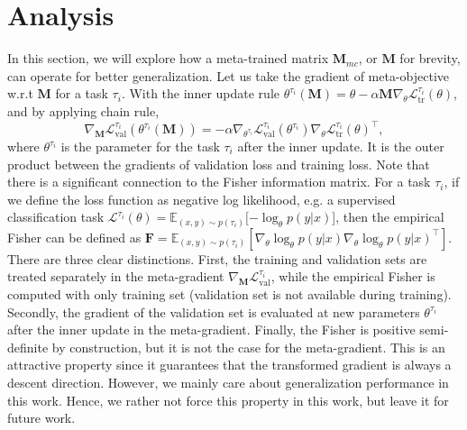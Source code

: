 \documentclass{article}
\newcommand*{\B}[1]{\mathbf{#1}}
\newcommand*{\C}[1]{\mathcal{#1}}
\begin{document}
\section{Analysis}
In this section, we will explore how a meta-trained matrix $\B{M}_{mc}$, or $\B{M}$ for brevity, can operate for better generalization. Let us take the gradient of meta-objective w.r.t $\B{M}$ for a task $\tau_i$. With the inner update rule $\theta^{\tau_i}(\B{M}) = \theta - \alpha  \B{M} \nabla_\theta \C{L}_\textrm{tr}^{\tau_i}(\theta)$, and by applying chain rule,
\begin{equation}
\nabla_{\mathbf{M}} \C{L}_\textrm{val}^{\tau_i}(\theta^{\tau_i}(\B{M})) = -\alpha \nabla_{\theta^{\tau_i}} \C{L}_\textrm{val}^{\tau_i} ( \theta^{\tau_i} ) \nabla_\theta \C{L}_\textrm{tr}^{\tau_i}(\theta)^\top, 
\end{equation}
where $\theta^{\tau_i}$ is the parameter for the task ${\tau_i}$ after the inner update.
It is the outer product between the gradients of validation loss and training loss. Note that there is a significant connection to the Fisher information matrix. For a task ${\tau_i}$, if we define the loss function as negative log likelihood, e.g. a supervised classification task $\mathcal{L}^{\tau_i} (\theta) = \mathbb{E}_{(x,y) \sim p({\tau_i})} [-\log_\theta p(y|x)$], then the empirical Fisher can be defined as $\mathbf{F} = \mathbb{E}_{(x,y) \sim p({\tau_i})} [\nabla_\theta \log_\theta p(y|x) \nabla_\theta \log_\theta p(y|x)^\top]$. There are three clear distinctions. First, the training and validation sets are treated separately in the meta-gradient $\nabla_{\B{M}} \C{L}_\textrm{val}^{\tau_i}$, while the empirical Fisher is computed with only training set (validation set is not available during training). Secondly, the gradient of the validation set is evaluated at new parameters $\theta^{\tau_i}$ after the inner update in the meta-gradient. Finally, the Fisher is positive semi-definite by construction, but it is not the case for the meta-gradient. This is an attractive property since it guarantees that the transformed gradient is always a descent direction. However, we mainly care about generalization performance in this work. Hence, we rather not force this property in this work, but leave it for future work.
\end{document}
